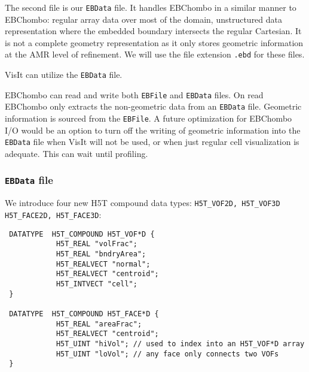 The second file is our {\tt EBData} file.  It handles EBChombo in a similar manner
to EBChombo:  regular array data over most of the domain, unstructured data
representation where the embedded boundary intersects the regular Cartesian. It is not
a complete geometry representation as it only stores geometric information at the
AMR level of refinement. We will use the file extension {\tt .ebd} for these files.

  VisIt can utilize the {\tt EBData} file.

  EBChombo can read and write both {\tt EBFile} and {\tt EBData} files.  On read
EBChombo only extracts the non-geometric data from an {\tt EBData} file. Geometric
information is sourced from the {\tt EBFile}.  A future optimization for EBChombo
I/O would be an option to turn off the writing of geometric information into the
{\tt EBData} file when VisIt will not be used, or when just regular cell visualization
is adequate.  This can wait until profiling.


\subsubsection{{\tt EBData} file }


  We introduce four new H5T compound data types: {\tt H5T\_VOF2D,  H5T\_VOF3D
H5T\_FACE2D, H5T\_FACE3D}:

\begin{verbatim}
 DATATYPE  H5T_COMPOUND H5T_VOF*D {
            H5T_REAL "volFrac";
            H5T_REAL "bndryArea";
            H5T_REALVECT "normal";
            H5T_REALVECT "centroid";
            H5T_INTVECT "cell"; 
 }

 DATATYPE  H5T_COMPOUND H5T_FACE*D {
            H5T_REAL "areaFrac";
            H5T_REALVECT "centroid";
            H5T_UINT "hiVol"; // used to index into an H5T_VOF*D array
            H5T_UINT "loVol"; // any face only connects two VOFs
 }
 
\end{verbatim}

